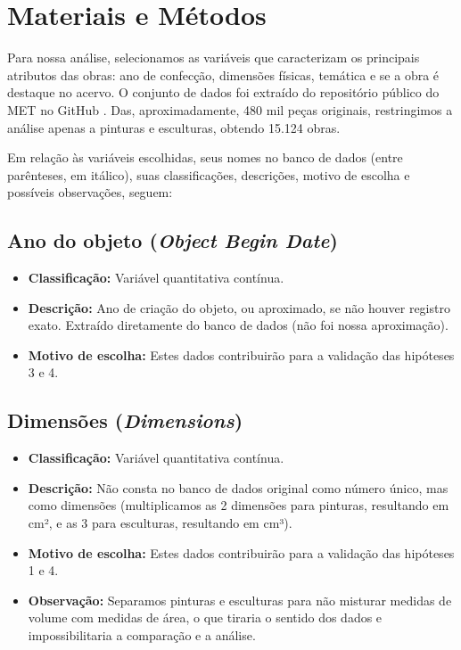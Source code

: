 \documentclass[11pt,a4paper]{article}
\begin{document}
\section{Materiais e Métodos}
Para nossa análise, selecionamos as variáveis que caracterizam os principais atributos das obras: ano de confecção, dimensões físicas, temática e se a obra é destaque no acervo. O conjunto de dados foi extraído do repositório público do MET no GitHub \cite{ref1}. 
Das, aproximadamente, 480 mil peças originais, restringimos a análise apenas a pinturas e esculturas, obtendo 15.124 obras.

Em relação às variáveis escolhidas, seus nomes no banco de dados (entre parênteses, em itálico), suas classificações, descrições, motivo de escolha e possíveis observações, seguem:

\subsection*{Ano do objeto (\textit{Object Begin Date})}
\begin{itemize}
    \item \textbf{Classificação:} Variável quantitativa contínua.
    \item \textbf{Descrição:} Ano de criação do objeto, ou aproximado, se não houver registro exato. Extraído diretamente do banco de dados (não foi nossa aproximação).
    \item \textbf{Motivo de escolha:} Estes dados contribuirão para a validação das hipóteses 3 e 4.
\end{itemize}

\subsection*{Dimensões (\textit{Dimensions})}
\begin{itemize}
    \item \textbf{Classificação:} Variável quantitativa contínua.
    \item \textbf{Descrição:} Não consta no banco de dados original como número único, mas como dimensões (multiplicamos as 2 dimensões para pinturas, resultando em cm², e as 3 para esculturas, resultando em cm³).
    \item \textbf{Motivo de escolha:} Estes dados contribuirão para a validação das hipóteses 1 e 4.
    \item \textbf{Observação:} Separamos pinturas e esculturas para não misturar medidas de volume com medidas de área, o que tiraria o sentido dos dados e impossibilitaria a comparação e a análise.
\end{itemize}
\end{document}
